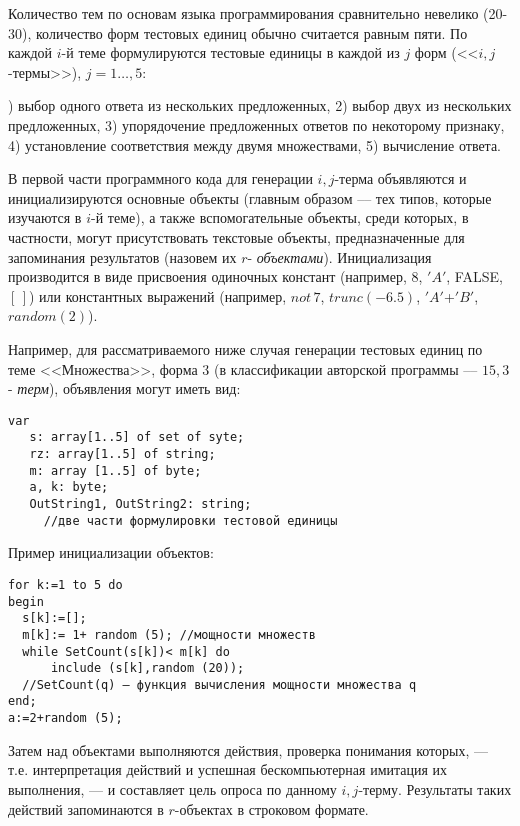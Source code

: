 Количество тем по основам языка программирования сравнительно невелико (20-30), количество форм тестовых единиц обычно считается равным пяти. По каждой $i$-й теме формулируются тестовые единицы в каждой из $j$ форм (<<$i,j$-термы>>), $j=1\dots,5$:
\par{}) выбор одного ответа из нескольких предложенных, 2) выбор двух из нескольких предложенных, 3) упорядочение предложенных ответов по некоторому признаку, 4) установление соответствия между двумя множествами, 5) вычисление ответа.
\par\smallskip
В первой части программного кода для генерации $i,j$-терма объявляются и инициализируются основные объекты (главным образом –-- тех типов, которые изучаются в $i$-й теме), а также вспомогательные объекты, среди которых, в частности, могут присутствовать текстовые объекты, предназначенные для запоминания результатов (назовем их $r$-\textit{ объектами}). Инициализация производится в виде присвоения одиночных констант (например, $8$, $'A'$, FALSE, $[\,]$) или константных выражений (например, $not\, 7$, $trunc (-6.5)$, $'A'$+$'B'$, $random(2)$).
\par\smallskip
Например, для рассматриваемого ниже случая генерации тестовых единиц по теме <<Множества>>, форма $3$ (в классификации авторской программы --– $15,3$-\textit{ терм}), объявления могут иметь вид:
\par\smallskip
\begin{verbatim}
var
   s: array[1..5] of set of syte;
   rz: array[1..5] of string;
   m: array [1..5] of byte;
   a, k: byte;
   OutString1, OutString2: string;
	 //две части формулировки тестовой единицы
\end{verbatim}

Пример инициализации объектов:
\par\smallskip
\begin{verbatim}
for k:=1 to 5 do
begin
  s[k]:=[];
  m[k]:= 1+ random (5); //мощности множеств
  while SetCount(s[k])< m[k] do
	  include (s[k],random (20));
  //SetCount(q) – функция вычисления мощности множества q
end;
a:=2+random (5);
\end{verbatim}
\par\smallskip
Затем над объектами выполняются действия, проверка понимания которых, --- т.е. интерпретация действий и успешная бескомпьютерная имитация их выполнения, --- и составляет цель опроса по данному $i,j$-терму. Результаты таких действий запоминаются в $r$-объектах в строковом формате.

